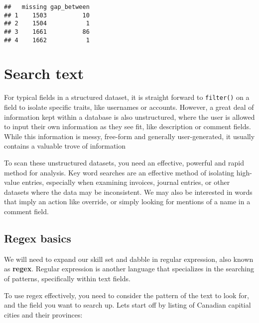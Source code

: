 \documentclass[
]{book}
\begin{document}
\begin{verbatim}
##   missing gap_between
## 1    1503          10
## 2    1504           1
## 3    1661          86
## 4    1662           1
\end{verbatim}

\hypertarget{test-searchtext}{%
\section{Search text}\label{test-searchtext}}

For typical fields in a structured dataset, it is straight forward to \texttt{filter()} on a field to isolate specific traits, like usernames or accounts. However, a great deal of information kept within a database is also unstructured, where the user is allowed to input their own information as they see fit, like description or comment fields. While this information is messy, free-form and generally user-generated, it usually contains a valuable trove of information

To scan these unstructured datasets, you need an effective, powerful and rapid method for analysis. Key word searches are an effective method of isolating high-value entries, especially when examining invoices, journal entries, or other datasets where the data may be inconsistent. We may also be interested in words that imply an action like override, or simply looking for mentions of a name in a comment field.

\hypertarget{regex-basics}{%
\subsection{Regex basics}\label{regex-basics}}

We will need to expand our skill set and dabble in regular expression, also known as \textbf{regex}. Regular expression is another language that specializes in the searching of patterns, specifically within text fields.

To use regex effectively, you need to consider the pattern of the text to look for, and the field you want to search up. Lets start off by listing of Canadian capitial cities and their provinces:
\end{document}
